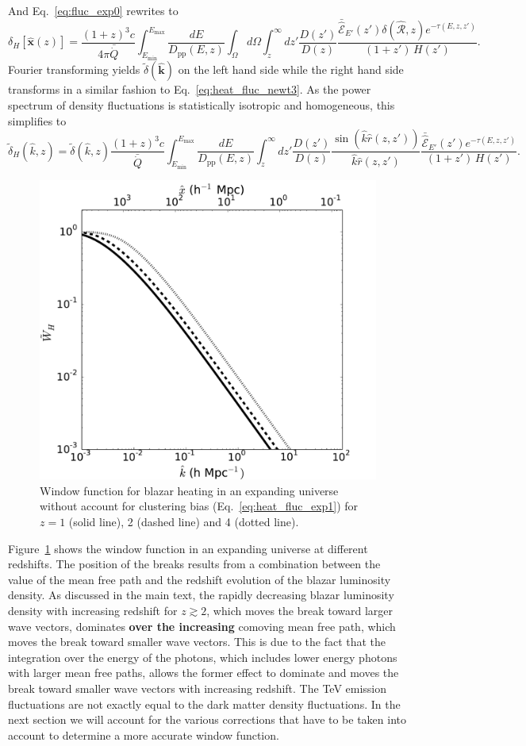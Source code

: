 \documentclass[numberedappendix]{emulateapj}
\newcommand\Ec[1]{{\color{magenta} \bf #1}} %
\begin{document}
And Eq.~\eqref{eq:fluc_exp0} rewrites to
\begin{equation}
\label{eq:heat_fluc_exp0}
\delta_H[\mathbf{\hat{x}}(z)]=\frac{(1+z)^3  c}{4\pi\bar{\dot{Q}}}\int_{E_{\mathrm{min}}}^{E_{\mathrm{max}}} \frac{dE}{D_{\mathrm{pp}}(E,z)} \int_{\Omega}d\Omega\int_z^{\infty}dz' \frac{D(z')}{D(z)} \frac{\bar{\hat{\mathcal{E}}}_{E'}(z')\delta(\mathbf{\hat{\mathcal{R}}}, z) e^{-\tau(E,z,z')}}{(1+z')\,H(z')}.
\end{equation}
Fourier transforming yields $\tilde{\delta}(\mathbf{\hat k})$ on the left hand side while the right hand side transforms in a similar fashion to Eq.~\eqref{eq:heat_fluc_newt3}. As the power spectrum of density fluctuations is statistically isotropic and homogeneous, this simplifies to
\begin{equation}
\label{eq:heat_fluc_exp1}
\tilde{\delta}_H(\hat k, z)=\tilde{\delta}(\hat k, z) \frac{(1+z)^3c}{\bar{\dot{Q}}} \int_{E_{\mathrm{min}}}^{E_{\mathrm{max}}} \frac{dE}{D_{\mathrm{pp}}(E,z)}\int_z^{\infty} dz' \frac{D(z')}{D(z)}\frac{\sin\left(\hat k\hat r(z,z')\right)}{\hat k \hat r(z, z')} \frac{\bar{\hat{\mathcal{E}}}_{E'}(z') e^{-\tau(E,z,z')}} {(1+z')\,H(z')}.
\end{equation}
\begin{figure}[h]
\centering
\includegraphics[width = .45\textwidth ]{window_nobias}
\caption{Window function for blazar heating in an expanding universe without account for clustering bias (Eq.~\eqref{eq:heat_fluc_exp1}) for $z=1$ (solid line), 2 (dashed line) and 4 (dotted line).}
\label{fig:window_nobiases}
\end{figure}
Figure~\ref{fig:window_nobiases} shows the window function in an expanding universe at different redshifts.  The position of the breaks results from a combination between the value of the mean free path and the redshift evolution of the blazar luminosity density. %
As discussed in the main text, the rapidly decreasing blazar luminosity density with increasing redshift for $z\gtrsim 2$, which moves the break toward larger wave vectors, dominates \Ec{over the increasing} comoving mean free path, which moves the break toward smaller wave vectors.  This is due to the fact that the integration over the energy of the photons, which includes lower energy photons with larger mean free paths, allows the former effect to dominate and moves the break toward smaller wave vectors with increasing redshift.
The TeV emission fluctuations are not exactly equal to the dark matter density fluctuations. In the next section we will account for the various corrections that have to be taken into account to determine a more accurate window function.
\end{document}
